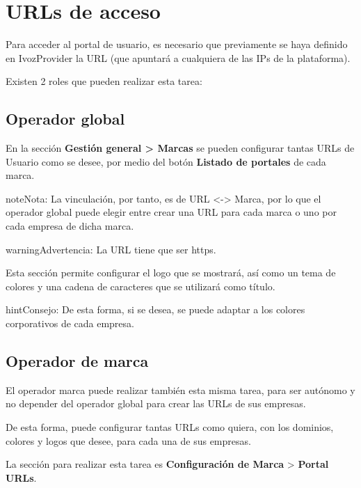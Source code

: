 \documentclass[letterpaper,10pt,spanish]{sphinxmanual}
\begin{document}
\section{URLs de acceso}
\label{userportal/index:access-urls}
Para acceder al portal de usuario, es necesario que previamente se haya definido en IvozProvider la URL (que apuntará a cualquiera de las IPs de la plataforma).

Existen 2 roles que pueden realizar esta tarea:


\subsection{Operador global}
\label{userportal/index:god-operator}
En la sección \textbf{Gestión general \textgreater{} Marcas} se pueden configurar tantas URLs de Usuario como se desee, por medio del botón \textbf{Listado de portales} de cada marca.

\begin{notice}{note}{Nota:}
La vinculación, por tanto, es de URL \textless{}-\textgreater{} Marca, por lo que el operador global puede elegir entre crear una URL para cada marca o uno por cada empresa de dicha marca.
\end{notice}

\begin{notice}{warning}{Advertencia:}
La URL tiene que ser https.
\end{notice}

Esta sección permite configurar el logo que se mostrará, así como un tema de colores y una cadena de caracteres que se utilizará como título.

\begin{notice}{hint}{Consejo:}
De esta forma, si se desea,  se puede adaptar a los colores corporativos de cada empresa.
\end{notice}


\subsection{Operador de marca}
\label{userportal/index:brand-operator}
El operador marca puede realizar también esta misma tarea, para ser autónomo y no depender del operador global para crear las URLs de sus empresas.

De esta forma, puede configurar tantas URLs como quiera, con los dominios, colores y logos que desee, para cada una de sus empresas.

La sección para realizar esta tarea es \textbf{Configuración de Marca} \textgreater{} \textbf{Portal URLs}.
\end{document}
